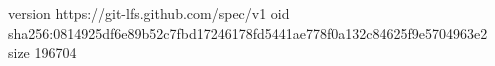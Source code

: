 version https://git-lfs.github.com/spec/v1
oid sha256:0814925df6e89b52c7fbd17246178fd5441ae778f0a132c84625f9e5704963e2
size 196704
